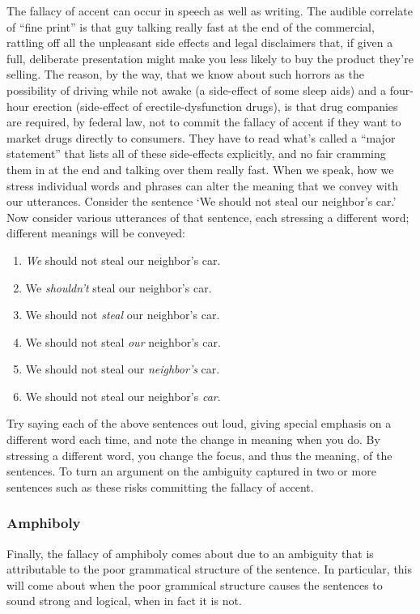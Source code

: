 The fallacy of accent can occur in speech as well as writing. The audible correlate of ``fine print''
is that guy talking really fast at the end of the commercial, rattling off all the unpleasant side effects
and legal disclaimers that, if given a full, deliberate presentation might make you less likely to buy
the product they're selling. The reason, by the way, that we know about such horrors as the
possibility of driving while not awake (a side-effect of some sleep aids) and a four-hour erection
(side-effect of erectile-dysfunction drugs), is that drug companies are required, by federal law, not
to commit the fallacy of accent if they want to market drugs directly to consumers. They have to
read what's called a ``major statement'' that lists all of these side-effects explicitly, and no fair
cramming them in at the end and talking over them really fast.
When we speak, how we stress individual words and phrases can alter the meaning that we convey
with our utterances. Consider the sentence `We should not steal our neighbor's car.' Now consider
various utterances of that sentence, each stressing a different word; different meanings will be
conveyed:

\begin{enumerate}
\item \emph{We} should not steal our neighbor's car.
\item We \emph{shouldn't} steal our neighbor's car.
\item We should not \emph{steal} our neighbor's car.
\item We should not steal \emph{our} neighbor's car.
\item We should not steal our \emph{neighbor's} car.
\item We should not steal our neighbor's \emph{car}.
\end{enumerate}

Try saying each of the above sentences out loud, giving special emphasis on a different word each time, and note the change in meaning when you do.
By stressing a different word, you change the focus, and thus the meaning, of the sentences. To turn an argument on the ambiguity captured in two 
or more sentences such as these risks committing the fallacy of accent.

\subsubsection{Amphiboly}


Finally, the fallacy of amphiboly comes about due to an ambiguity that is attributable to the poor grammatical structure of the sentence.
In particular, this will come about when the poor grammical structure causes the sentences to sound strong and logical, when in fact it is not.

